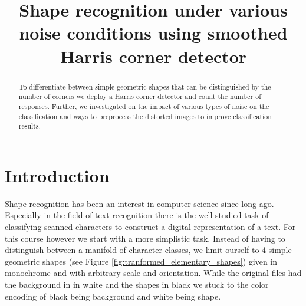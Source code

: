 \documentclass[conference]{IEEEtran}
\begin{document}
%
\title{Shape recognition under various noise conditions using smoothed Harris corner detector}


\author{
\and
{}
}


\maketitle


\begin{abstract}
To differentiate between simple geometric shapes that can be distinguished by the number
of corners we deploy a Harris corner detector\cite{Harris88acombined} and count
the number of responses. Further, we 
investigated on the impact of various types of noise on the classification and ways
to preprocess the distorted images to improve classification results.
\end{abstract}

\section{Introduction}
Shape recognition has been an interest in computer science since long ago. Especially in the
field of text recognition there is the well studied task of classifying scanned characters 
to construct a digital representation of a text. 
For this course however we start with a more simplistic task. Instead of having to
distinguish between a manifold of character classes, we limit ourself to 
4 simple geometric shapes (see Figure \ref{fig:tranformed_elementary_shapes}) given in monochrome and with arbitrary scale and orientation. While the original files had the 
background in in white and the shapes in black we stuck to the color encoding of black being
background and white being shape.
\end{document}
